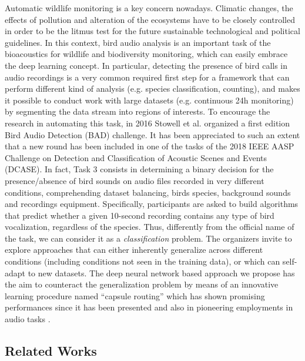 Automatic wildlife monitoring is a key concern nowadays. Climatic changes, the effects of pollution and alteration of the ecosystems have to be closely controlled in order to be the litmus test for the future sustainable technological and political guidelines.
In this context, bird audio analysis is an important task of the bioacoustics for wildlife and biodiversity monitoring, which can easily embrace the deep learning concept.
In particular, detecting the presence of bird calls in audio recordings is a very common required first step for a framework that can perform different kind of  analysis (e.g. species classification, counting), and makes it possible to conduct work with large datasets (e.g. continuous 24h monitoring) by segmenting the data stream into regions of interests.
To encourage the research in automating this task, in 2016 Stowell et al. \cite{stowell2016bird} organized a first edition Bird Audio Detection (BAD) challenge. It has been appreciated to such an extent that a new round has been included in one of the tasks of the 2018 IEEE AASP Challenge on Detection and Classification of Acoustic Scenes and Events (DCASE). In fact, Task 3 consists in determining a binary decision for the presence/absence of bird sounds on audio files recorded in very different conditions, comprehending dataset balancing, birds species, background sounds and recordings equipment.
Specifically, participants are asked to build algorithms that predict whether a given 10-second recording contains any type of bird vocalization, regardless of the species. Thus, differently from the official name of the task, we can consider it as a \textit{classification} problem.
The organizers invite to explore approaches that can either inherently generalize across different conditions (including conditions not seen in the training data), or which can self-adapt to new datasets. The deep neural network based approach we propose has the aim to counteract the generalization problem by means of an innovative learning procedure named ``capsule routing'' which has shown promising performances since it has been presented \cite{sabour2017dynamic} and also in pioneering employments in audio tasks \cite{iqbal2018capsule}.


\subsection{Related Works}

